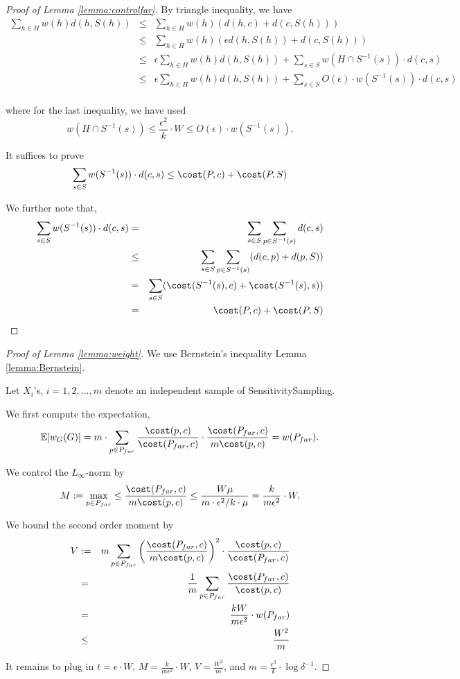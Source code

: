 \begin{proof}[Proof of Lemma \ref{lemma:controlfar}]

By triangle inequality, we have 
\begin{eqnarray*}
\sum_{h\in H} w(h) d(h,S(h))&\leq& \sum_{h\in H} w(h) (d(h,c)+d(c,S(h)))\\
&\leq & \sum_{h\in H} w(h) (\epsilon d(h,S(h))+d(c,S(h)))\\
&\leq & \epsilon \sum_{h\in H} w(h) d(h,S(h))+ \sum_{s\in S} w(H\cap S^{-1}(s))\cdot d(c,s)\\
&\leq & \epsilon \sum_{h\in H} w(h) d(h,S(h))+ \sum_{s\in S} O(\epsilon)\cdot w(S^{-1}(s))\cdot d(c,s)\\
\end{eqnarray*}

where for the last inequality, we have used $$
w(H\cap S^{-1}(s))\leq \frac{\epsilon^2}{k}\cdot W\leq O(\epsilon)\cdot w(S^{-1}(s)).
$$

It suffices to prove $$
\sum_{s\in S} w(S^{-1}(s)) \cdot d(c,s)\leq \cost(P,c)+\cost(P,S)
$$

We further note that,
\begin{eqnarray*}
\sum_{s\in S}w(S^{-1}(s))\cdot d(c,s)&=&\sum_{s\in S}\sum_{p\in S^{-1}(s)} d(c,s)\\
&\leq & \sum_{s\in S}\sum_{p\in S^{-1}(s)} (d(c,p)+d(p,S))\\
&=&\sum_{s\in S}(\cost(S^{-1}(s),c)+\cost(S^{-1}(s),s))\\
&=&\cost(P,c)+\cost(P,S)
\end{eqnarray*}

\end{proof}


\begin{proof}[Proof of Lemma \ref{lemma:weight}]
We use Bernstein's inequality Lemma \ref{lemma:Bernstein}.

Let $X_i$'s, $i=1,2,...,m$ denote an independent sample of \textsf{SensitivitySampling}.

We first compute the expectation,
$$
\mathbb{E}[w_G(G)]=m\cdot \sum_{p\in P_{far}}\frac{\cost(p,c)}{\cost(P_{far},c)}\cdot \frac{\cost(P_{far},c)}{m\cost(p,c)}=w(P_{far}).
$$

We control the $L_{\infty}$-norm by
$$
M:=\max_{p\in P_{far}} \leq \frac{\cost(P_{far},c)}{m\cost(p,c)}\leq \frac{W\mu}{m\cdot \epsilon^2/k\cdot \mu}=\frac{k}{m\epsilon^2}\cdot W.
$$

We bound the second order moment by
\begin{eqnarray*}
V&:=&m\sum_{p\in P_{far}} \bigg{(}\frac{\cost(P_{far},c)}{m\cost(p,c)}
\bigg{)}^2\cdot \frac{\cost(p,c)}{\cost(P_{far},c)}
\\
&=&\frac{1}{m}\sum_{p\in P_{far}}\frac{\cost(P_{far},c)}{\cost(p,c)}\\
&=&\frac{kW}{m\epsilon^2}\cdot w(P_{far})\\
&\leq & \frac{W^2}{m}
\end{eqnarray*}

It remains to plug in $t=\epsilon\cdot W$, $M=\frac{k}{m\epsilon^2}\cdot W$, $V=\frac{W^2}{m}$, and $m=\frac{\epsilon^3}{k}\cdot \log\delta^{-1}$.
\end{proof}


